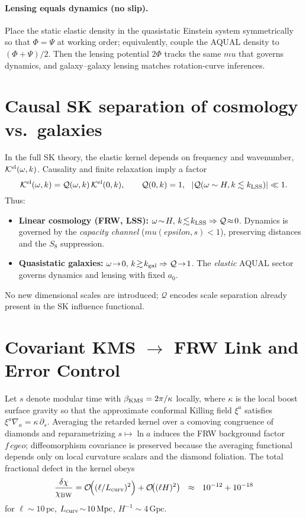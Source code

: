 \documentclass[aps,prd,onecolumn,superscriptaddress,nofootinbib]{revtex4-2}
\def\cgeo{cgeo}%
\def\eps{epsilon}%
\def\mu{mu}%
\providecommand{\cgeo}{c_{\rm geo}}
\providecommand{\eps}{\varepsilon}
\providecommand{\be}{\begin{equation}}
\providecommand{\ee}{\end{equation}}
\begin{document}
\paragraph{Lensing equals dynamics (no slip).}
Place the static elastic density in the quasistatic Einstein system symmetrically so that \(\Phi=\Psi\) at working order; equivalently, couple the AQUAL density to \((\Phi+\Psi)/2\). Then the lensing potential \(2\Phi\) tracks the same \(\mu\) that governs dynamics, and galaxy–galaxy lensing matches rotation-curve inferences.

\section{Causal SK separation of cosmology vs.\ galaxies}
\label{sec:sk-separation}
In the full SK theory, the elastic kernel depends on frequency and wavenumber, \(\mathcal K^{\rm el}(\omega,k)\). Causality and finite relaxation imply a factor
\[
\mathcal K^{\rm el}(\omega,k)=\mathcal Q(\omega,k)\,\mathcal K^{\rm el}(0,k),\qquad \mathcal Q(0,k)=1,\ \ |\mathcal Q(\omega\sim H,k\lesssim k_{\rm LSS})|\ll 1.
\]
Thus:
\begin{itemize}[leftmargin=*,noitemsep,topsep=0pt]
\item \textbf{Linear cosmology (FRW, LSS):} \(\omega\!\sim\!H,\,k\!\lesssim\!k_{\rm LSS}\Rightarrow \mathcal Q\!\approx\!0\). Dynamics is governed by the \emph{capacity channel} (\(\mu(\eps,s)<1\)), preserving distances and the \(S_8\) suppression.
\item \textbf{Quasistatic galaxies:} \(\omega\!\to\!0,\,k\!\gtrsim\!k_{\rm gal}\Rightarrow \mathcal Q\!\to\!1\). The \emph{elastic} AQUAL sector governs dynamics and lensing with fixed \(a_0\).
\end{itemize}
No new dimensional scales are introduced; \(\mathcal Q\) encodes scale separation already present in the SK influence functional.

\section{Covariant KMS \texorpdfstring{$\to$}{->} FRW Link and Error Control}
\label{sec:kms-frw}
Let \(s\) denote modular time with \(\beta_{\rm KMS}=2\pi/\kappa\) locally, where \(\kappa\) is the local boost surface gravity so that the approximate conformal Killing field \(\xi^a\) satisfies \(\xi^a\nabla_a=\kappa\,\partial_s\).
Averaging the retarded kernel over a comoving congruence of diamonds and reparametrizing \(s\mapsto \ln a\) induces the FRW background factor \(f\,\cgeo\); diffeomorphism covariance is preserved because the averaging functional depends only on local curvature scalars and the diamond foliation. The total fractional defect in the kernel obeys
\be
\label{eq:chi-defect}
\frac{\delta\chi}{\chi_{\rm BW}}=\mathcal O\!\Big((\ell/L_{\rm curv})^2\Big)+\mathcal O\!\big((\ell H)^2\big)
\ \ \approx\ \ 10^{-12}+10^{-18}
\ee
for \(\ell\!\sim\!10\,\mathrm{pc}\), \(L_{\rm curv}\!\sim\!10\,\mathrm{Mpc}\), \(H^{-1}\!\sim\!4\,\mathrm{Gpc}\).
\end{document}
